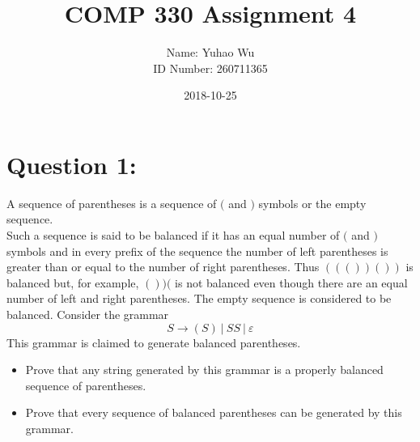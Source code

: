 \documentclass [9 pt]{article}
\theoremstyle{definition}
\begin{document}
\title{COMP 330 Assignment 4}
\date{2018-10-25}
\author{Name: Yuhao Wu\\
ID Number: 260711365
}
\maketitle

\section*{Question 1:}
A sequence of parentheses is a sequence of $($ and $)$ symbols or the empty sequence.\\
 Such a sequence is said to be balanced if it has an equal number of $($ and $)$ symbols and in every prefix of the sequence the number of left parentheses is greater than or equal to the number of right parentheses. Thus $((())())$ is balanced but, for example, $())($ is not balanced even though there are an equal number of left and right parentheses. The empty sequence is considered to be balanced.
 Consider the grammar
$$S \to (S)\ |\ SS\ |\ \varepsilon$$
This grammar is claimed to generate balanced parentheses.
\begin{itemize}
	\item Prove that any string generated by this grammar is a properly balanced sequence of parentheses.
	\item Prove that every sequence of balanced parentheses can be generated by this grammar.
\end{itemize}

\newpage
\end{document}
